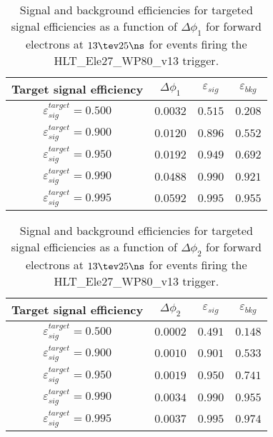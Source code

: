\clearpage

\begin{table}[!bht]
  \begin{center}
    \begin{tabular}{cccc}
      \hline
      Target signal efficiency & $\Delta\phi_1$ & $\varepsilon_{sig}$ & $\varepsilon_{bkg}$ \\ 
      \hline
      $\varepsilon_{sig}^{target} = 0.500$ & $  0.0032$ & $0.515$ & $0.208$ \\
      $\varepsilon_{sig}^{target} = 0.900$ & $  0.0120$ & $0.896$ & $0.552$ \\
      $\varepsilon_{sig}^{target} = 0.950$ & $  0.0192$ & $0.949$ & $0.692$ \\
      $\varepsilon_{sig}^{target} = 0.990$ & $  0.0488$ & $0.990$ & $0.921$ \\
      $\varepsilon_{sig}^{target} = 0.995$ & $  0.0592$ & $0.995$ & $0.955$ \\
      \hline
    \end{tabular}
    \caption{Signal and background efficiencies for targeted signal efficiencies as a function of $\Delta\phi_1$ for forward electrons at $13\tev 25\ns$ for events firing the HLT\_Ele27\_WP80\_v13 trigger.}
    \label{tab:eff_rej_phi1_beam_13_25_trigger_27_F}
  \end{center}
\end{table}

\clearpage

\begin{table}[!bht]
  \begin{center}
    \begin{tabular}{cccc}
      \hline
      Target signal efficiency & $\Delta\phi_2$ & $\varepsilon_{sig}$ & $\varepsilon_{bkg}$ \\ 
      \hline
      $\varepsilon_{sig}^{target} = 0.500$ & $  0.0002$ & $0.491$ & $0.148$ \\
      $\varepsilon_{sig}^{target} = 0.900$ & $  0.0010$ & $0.901$ & $0.533$ \\
      $\varepsilon_{sig}^{target} = 0.950$ & $  0.0019$ & $0.950$ & $0.741$ \\
      $\varepsilon_{sig}^{target} = 0.990$ & $  0.0034$ & $0.990$ & $0.955$ \\
      $\varepsilon_{sig}^{target} = 0.995$ & $  0.0037$ & $0.995$ & $0.974$ \\
      \hline
    \end{tabular}
    \caption{Signal and background efficiencies for targeted signal efficiencies as a function of $\Delta\phi_2$ for forward electrons at $13\tev 25\ns$ for events firing the HLT\_Ele27\_WP80\_v13 trigger.}
    \label{tab:eff_rej_phi2_beam_13_25_trigger_27_F}
  \end{center}
\end{table}

